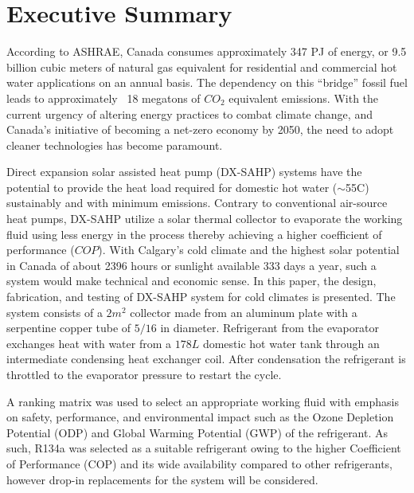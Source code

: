 \documentclass{ucalgarythesis}
\begin{document}
\frontmatter
\makethesistitle
\newpage


\chapter{Executive Summary}
According to ASHRAE, Canada consumes approximately 347 PJ of energy, or 9.5 billion cubic meters of natural gas equivalent for residential and commercial hot water applications on an annual basis. The dependency on this “bridge” fossil fuel leads to approximately ~18 megatons of $CO_2$
equivalent emissions. With the current urgency of altering energy practices to combat climate change, and Canada’s initiative of becoming a net-zero economy by 2050, the need to adopt cleaner technologies has become paramount.

\medskip
Direct expansion solar assisted heat pump (DX-SAHP) systems have the potential to provide the heat load required for domestic hot water ($\sim$55\textdegree C) sustainably and with minimum emissions. Contrary to conventional air-source heat pumps, DX-SAHP utilize a solar thermal
collector to evaporate the working fluid using less energy in the process thereby achieving a higher coefficient of performance ($COP$). With Calgary’s cold climate and the highest solar potential in Canada of about 2396 hours or sunlight available 333 days a year, such a system would make technical and economic sense. In this paper, the design, fabrication, and testing of DX-SAHP system for cold climates is presented. The system consists of a $2m^2$ collector made from an aluminum plate with a serpentine copper tube of $5/16$ in diameter.
Refrigerant from the evaporator exchanges heat with water from a $178L$ domestic hot water tank through an intermediate condensing heat exchanger coil. After condensation the refrigerant is throttled to the evaporator pressure to restart the cycle.

\medskip 
A ranking matrix was used to select an appropriate working fluid with emphasis on safety, performance, and environmental impact such as the Ozone Depletion Potential (ODP) and Global Warming Potential (GWP) of the refrigerant. As such, R134a was selected as a suitable refrigerant owing to the higher Coefficient of Performance (COP) and its wide availability
compared to other refrigerants, however drop-in replacements for the system will be considered.
\end{document}
